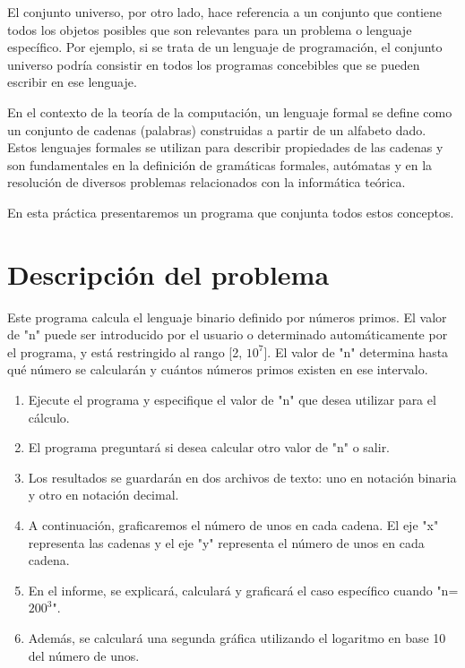 \documentclass[11pt]{article} %
\begin{document}
	El conjunto universo, por otro lado, hace referencia a un conjunto que contiene todos los objetos posibles que son relevantes para un problema o lenguaje específico. Por ejemplo, si se trata de un lenguaje de programación, el conjunto universo podría consistir en todos los programas concebibles que se pueden escribir en ese lenguaje.
	
	En el contexto de la teoría de la computación, un lenguaje formal se define como un conjunto de cadenas (palabras) construidas a partir de un alfabeto dado. Estos lenguajes formales se utilizan para describir propiedades de las cadenas y son fundamentales en la definición de gramáticas formales, autómatas y en la resolución de diversos problemas relacionados con la informática teórica.
	
	En esta práctica presentaremos un programa que conjunta todos estos conceptos.
	
	\section{Descripción del problema}

	Este programa calcula el lenguaje binario definido por números primos. El valor de "n" puede ser introducido por el usuario o determinado automáticamente por el programa, y está restringido al rango [2, $10^7$]. El valor de "n" determina hasta qué número se calcularán y cuántos números primos existen en ese intervalo.	

	\begin{enumerate}
		\item Ejecute el programa y especifique el valor de "n" que desea utilizar para el cálculo.
		\item El programa preguntará si desea calcular otro valor de "n" o salir.
		\item Los resultados se guardarán en dos archivos de texto: uno en notación binaria y otro en notación decimal.
		\item A continuación, graficaremos el número de unos en cada cadena. El eje "x" representa las cadenas y el eje "y" representa el número de unos en cada cadena.
		\item En el informe, se explicará, calculará y graficará el caso específico cuando "n=$200^3$".
		\item Además, se calculará una segunda gráfica utilizando el logaritmo en base 10 del número de unos.
	\end{enumerate}
	
	
\end{document}
